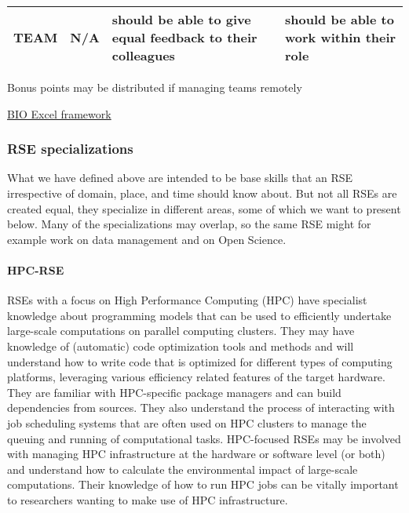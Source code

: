 \documentclass[a4paper
]{article}
\begin{document}
\begin{landscape}
\begin{longtable}[]{@{}llll@{}}
\begin{minipage}[t]{0.19\columnwidth}\raggedright
TEAM\strut
\end{minipage} & \begin{minipage}[t]{0.28\columnwidth}\raggedright
N/A\strut
\end{minipage} & \begin{minipage}[t]{0.28\columnwidth}\raggedright
should be able to give equal feedback to their colleagues\strut
\end{minipage} & \begin{minipage}[t]{0.14\columnwidth}\raggedright
should be able to work within their role\strut
\end{minipage}\tabularnewline
\bottomrule
\end{longtable}

\end{landscape}

Bonus points may be distributed if managing teams remotely

\href{https://competency.ebi.ac.uk/framework/bioexcel/3.0/carreer-profiles}{BIO
Excel framework}

\hypertarget{rse-specializations}{%
\subsubsection{RSE specializations}\label{rse-specializations}}

What we have defined above are intended to be base skills that an RSE
irrespective of domain, place, and time should know about. But not all
RSEs are created equal, they specialize in different areas, some of
which we want to present below. Many of the specializations may overlap,
so the same RSE might for example work on data management and on Open
Science.

\hypertarget{hpc-rse}{%
\paragraph{HPC-RSE}\label{hpc-rse}}

RSEs with a focus on High Performance Computing (HPC) have specialist
knowledge about programming models that can be used to efficiently
undertake large-scale computations on parallel computing clusters. They
may have knowledge of (automatic) code optimization tools and methods
and will understand how to write code that is optimized for different
types of computing platforms, leveraging various efficiency related
features of the target hardware. They are familiar with HPC-specific
package managers and can build dependencies from sources. They also
understand the process of interacting with job scheduling systems that
are often used on HPC clusters to manage the queuing and running of
computational tasks. HPC-focused RSEs may be involved with managing HPC
infrastructure at the hardware or software level (or both) and
understand how to calculate the environmental impact of large-scale
computations. Their knowledge of how to run HPC jobs can be vitally
important to researchers wanting to make use of HPC infrastructure.
\end{document}
